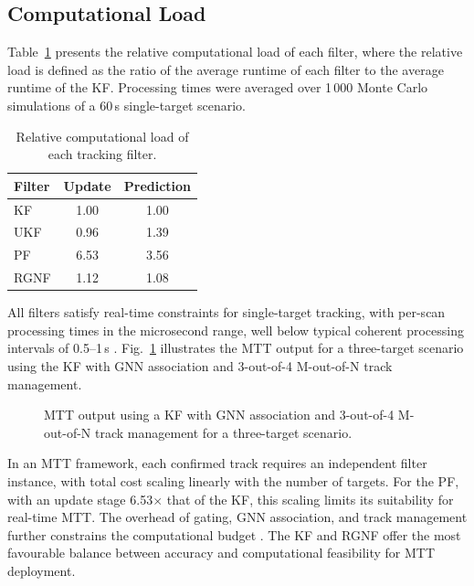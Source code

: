 \documentclass[conference,10pt,a4paper]{IEEEtran}%
\begin{document}
\subsection{Computational Load}
Table~\ref{tab:comp_load} presents the relative computational load of each filter, where the relative load is defined as the ratio of the average runtime of each filter to the average runtime of the KF. Processing times were averaged over 1\,000 Monte Carlo simulations of a 60\,s single-target scenario.                                                     
\begin{table}[H]                                                  
  \centering                                                      
  \caption{Relative computational load of each tracking filter.}       
  \label{tab:comp_load}
  \begin{tabular}{@{}lcc@{}}
  \toprule
  \textbf{Filter} & \textbf{Update} & \textbf{Prediction} \\
  \midrule
  KF   & 1.00 & 1.00 \\
  UKF  & 0.96 & 1.39 \\
  PF   & 6.53 & 3.56 \\
  RGNF & 1.12 & 1.08 \\
  \bottomrule
  \end{tabular}
\end{table}

All filters satisfy real-time constraints for single-target tracking, with per-scan processing times in the microsecond range, well below typical coherent processing intervals of 0.5--1\,s \cite{Howland2005a}. Fig.~\ref{fig:mtt_output} illustrates the MTT output for a three-target scenario using the KF with GNN association and 3-out-of-4 M-out-of-N track management.                                                                      
\begin{figure}[H]
    \centering
    
    \caption{MTT output using a KF with GNN association and 3-out-of-4 M-out-of-N track management for a three-target
scenario.}
    \label{fig:mtt_output}
\end{figure}

In an MTT framework, each confirmed track requires an independent filter instance, with total cost scaling linearly with the number of targets. For the PF, with an update stage 6.53$\times$ that of the KF, this scaling limits its suitability for real-time MTT. The overhead of gating, GNN association, and track management further constrains the computational budget \cite{Konstantinova2003}. The KF and RGNF offer the most favourable balance between accuracy and computational feasibility for MTT deployment.
\end{document}
